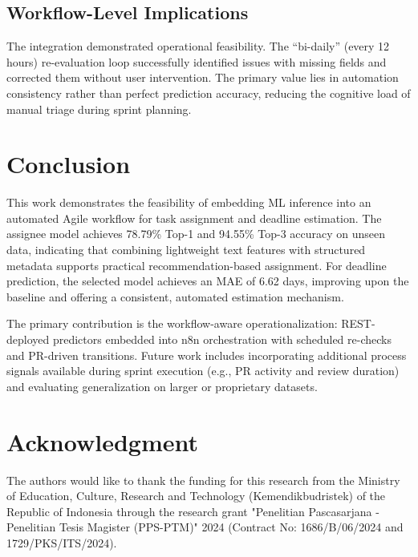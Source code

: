 \documentclass[conference]{IEEEtran}
\begin{document}
\subsection{Workflow-Level Implications}

The integration demonstrated operational feasibility. The ``bi-daily'' (every 12 hours) re-evaluation loop successfully identified issues with missing fields and corrected them without user intervention. The primary value lies in automation consistency rather than perfect prediction accuracy, reducing the cognitive load of manual triage during sprint planning.

\section{Conclusion}

This work demonstrates the feasibility of embedding ML inference into an automated Agile workflow for task assignment and deadline estimation. The assignee model achieves 78.79\% Top-1 and 94.55\% Top-3 accuracy on unseen data, indicating that combining lightweight text features with structured metadata supports practical recommendation-based assignment. For deadline prediction, the selected model achieves an MAE of 6.62 days, improving upon the baseline and offering a consistent, automated estimation mechanism.

The primary contribution is the workflow-aware operationalization: REST-deployed predictors embedded into n8n orchestration with scheduled re-checks and PR-driven transitions. Future work includes incorporating additional process signals available during sprint execution (e.g., PR activity and review duration) and evaluating generalization on larger or proprietary datasets.

\section*{Acknowledgment}

The authors would like to thank the funding for this research from the Ministry of Education, Culture, Research and Technology (Kemendikbudristek) of the Republic of Indonesia through the research grant "Penelitian Pascasarjana - Penelitian Tesis Magister (PPS-PTM)" 2024 (Contract No: 1686/B/06/2024 and 1729/PKS/ITS/2024).
\end{document}
